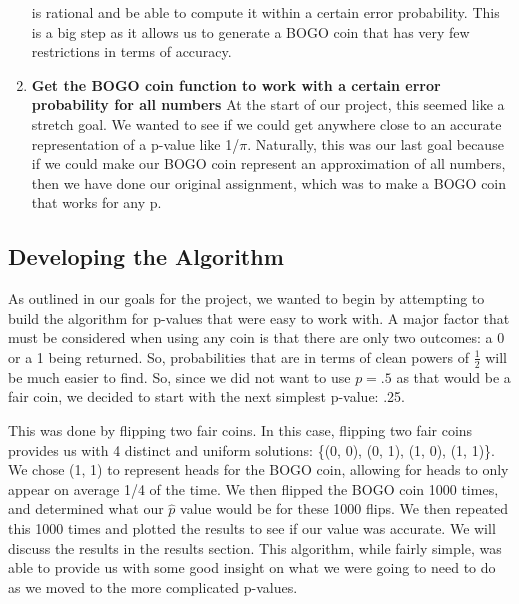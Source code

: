 \documentclass[11pt]{article}
\begin{document}
\begin{enumerate}
        is rational and be able to compute it within a certain error probability. This is a big 
        step as it allows us to generate a BOGO coin that has very few restrictions in terms of 
        accuracy.
    \item \textbf{Get the BOGO coin function to work with a certain error probability
    for all numbers}
        \subitem At the start of our project, this seemed like a stretch goal. We wanted to see
        if we could get anywhere close to an accurate representation of a p-value like 1/$\pi$.
        Naturally, this was our last goal because if we could make our BOGO coin represent
        an approximation of all numbers, then we have done our original assignment, which was
        to make a BOGO coin that works for any p.
\end{enumerate} 

\subsection*{Developing the Algorithm}
    \quad As outlined in our goals for the project, we wanted to begin by attempting to build the 
    algorithm for p-values that were easy to work with. A major factor that must be considered when 
    using any coin is that there are only two outcomes: a 0 or a 1 being returned. So, probabilities 
    that are in terms of clean powers of $\frac{1}{2}$ will be much easier to find. So, since we did 
    not want to use $p=.5$ as that would be a fair coin, we decided to start with the next simplest 
    p-value: .25. 

    This was done by flipping two fair coins. In this case, flipping two fair coins provides 
    us with 4 distinct and uniform solutions: \{(0, 0), (0, 1), (1, 0), (1, 1)\}. We chose (1, 1) to 
    represent heads for the BOGO coin, allowing for heads to only appear on average 1/4 of the time. 
    We then flipped the BOGO coin 1000 times, and determined what our $\hat{p}$ value would be for 
    these 1000 flips. We then repeated this 1000 times and plotted the results to see if our value was 
    accurate. We will discuss the results in the results section. This algorithm, while fairly simple, 
    was able to provide us with some good insight on what we were going to need to do as we moved 
    to the more complicated p-values.
\end{document}
